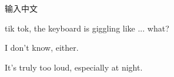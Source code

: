 \documentclass{article}
\begin{document}
输入中文

tik tok, the keyboard is giggling like ... what?

I don't know, either.

It's truly too loud, especially at night.
\end{document}
